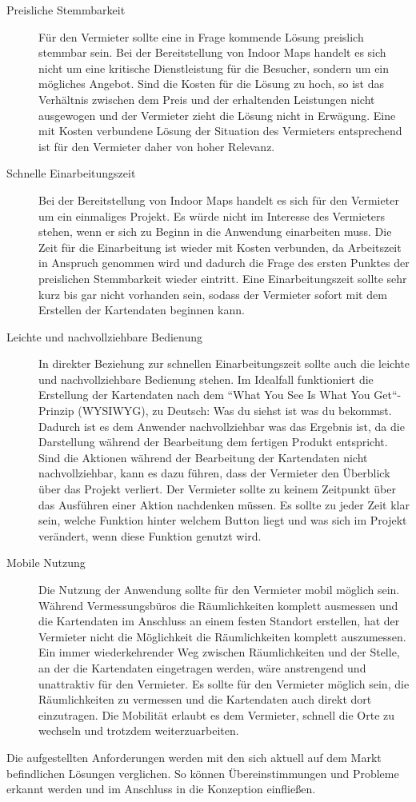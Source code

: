 \begin{description}
	\item[Preisliche Stemmbarkeit]
	Für den Vermieter sollte eine in Frage kommende Lösung preislich stemmbar sein.
	Bei der Bereitstellung von Indoor Maps handelt es sich nicht um eine kritische Dienstleistung für die Besucher, sondern um ein mögliches Angebot.
	Sind die Kosten für die Lösung zu hoch, so ist das Verhältnis zwischen dem Preis und der erhaltenden Leistungen nicht ausgewogen und der Vermieter zieht die Lösung nicht in Erwägung.\pbreak%
	Eine mit Kosten verbundene Lösung der Situation des Vermieters entsprechend ist für den Vermieter daher von hoher Relevanz.
	\item[Schnelle Einarbeitungszeit]
	Bei der Bereitstellung von Indoor Maps handelt es sich für den Vermieter um ein einmaliges Projekt.
	Es würde nicht im Interesse des Vermieters stehen, wenn er sich zu Beginn in die Anwendung einarbeiten muss.
	Die Zeit für die Einarbeitung ist wieder mit Kosten verbunden, da Arbeitszeit in Anspruch genommen wird und dadurch die Frage des ersten Punktes der preislichen Stemmbarkeit wieder eintritt.\pbreak%
	Eine Einarbeitungszeit sollte sehr kurz bis gar nicht vorhanden sein, sodass der Vermieter sofort mit dem Erstellen der Kartendaten beginnen kann.
	\item[Leichte und nachvollziehbare Bedienung]
	In direkter Beziehung zur schnellen Einarbeitungszeit sollte auch die leichte und nachvollziehbare Bedienung stehen.
	Im Idealfall funktioniert die Erstellung der Kartendaten nach dem ``What You See Is What You Get``-Prinzip (WYSIWYG), zu Deutsch: Was du siehst ist was du bekommst.
	Dadurch ist es dem Anwender nachvollziehbar was das Ergebnis ist, da die Darstellung während der Bearbeitung dem fertigen Produkt entspricht.
	Sind die Aktionen während der Bearbeitung der Kartendaten nicht nachvollziehbar, kann es dazu führen, dass der Vermieter den Überblick über das Projekt verliert.\pbreak%
	Der Vermieter sollte zu keinem Zeitpunkt über das Ausführen einer Aktion nachdenken müssen.
	Es sollte zu jeder Zeit klar sein, welche Funktion hinter welchem Button liegt und was sich im Projekt verändert, wenn diese Funktion genutzt wird.
	\item[Mobile Nutzung]
	Die Nutzung der Anwendung sollte für den Vermieter mobil möglich sein.
	Während Vermessungsbüros die Räumlichkeiten komplett ausmessen und die Kartendaten im Anschluss an einem festen Standort erstellen, hat der Vermieter nicht die Möglichkeit die Räumlichkeiten komplett auszumessen.
	Ein immer wiederkehrender Weg zwischen Räumlichkeiten und der Stelle, an der die Kartendaten eingetragen werden, wäre anstrengend und unattraktiv für den Vermieter.\pbreak%
	Es sollte für den Vermieter möglich sein, die Räumlichkeiten zu vermessen und die Kartendaten auch direkt dort einzutragen.
	Die Mobilität erlaubt es dem Vermieter, schnell die Orte zu wechseln und trotzdem weiterzuarbeiten.\pagebreak
\end{description}
Die aufgestellten Anforderungen werden mit den sich aktuell auf dem Markt befindlichen Lösungen verglichen.
So können Übereinstimmungen und Probleme erkannt werden und im Anschluss in die Konzeption einfließen.

